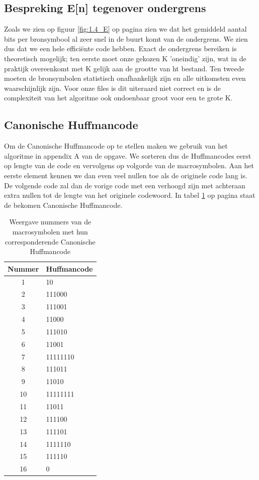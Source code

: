 \documentclass[11pt,a4paper]{article}
\begin{document}
\subsection{Bespreking E[n] tegenover ondergrens}

Zoals we zien op figuur \ref{fig:1.4_E} op pagina \pageref{fig:1.4_E} zien we dat het gemiddeld aantal bits per bronsymbool al zeer snel in de buurt komt van de ondergrens. We zien dus dat we een hele effici\"ente code hebben. Exact de ondergrens bereiken is theoretisch mogelijk; ten eerste moet onze gekozen K 'oneindig' zijn, wat in de praktijk overeenkomt met K gelijk aan de grootte van ht bestand. Ten tweede moeten de bronsymbolen statistisch onafhankelijk zijn en alle uitkomsten even waarschijnlijk zijn. Voor onze files is dit uiteraard niet correct en is de complexiteit van het algoritme ook ondoenbaar groot voor een te grote K. 

\subsection{Canonische Huffmancode}

Om de Canonische Huffmancode op te stellen maken we gebruik van het algoritme in appendix A van de opgave. We sorteren dus de Huffmancodes eerst op lengte van de code en vervolgens op volgorde van de macrosymbolen. Aan het eerste element kennen we dan even veel nullen toe als de originele code lang is. De volgende code zal dan de vorige code met een verhoogd zijn met achteraan extra nullen tot de lengte van het originele codewoord. In tabel \ref{tab:1.3} op pagina \pageref{tab:1.3} staat de bekomen Canonische Huffmancode.  

\begin{table}
\centering
\begin{tabular}{c|l}
Nummer & Huffmancode \\
\hline
1 & 10\\
\hline
2 & 111000\\
\hline
3 & 111001\\
\hline
4 & 11000\\
\hline
5 & 111010\\
\hline
6 & 11001\\
\hline
7 & 11111110\\
\hline
8 & 111011\\
\hline
9 & 11010\\
\hline
10 & 11111111\\
\hline
11 & 11011\\
\hline
12 & 111100\\
\hline
13 & 111101\\
\hline
14 & 1111110\\
\hline
15 & 111110\\
\hline
16 & 0\\
\end{tabular} 
\caption{Weergave nummers van de macrosymbolen met hun corresponderende Canonische Huffmancode}
\label{tab:1.3}
\end{table}
\end{document}
